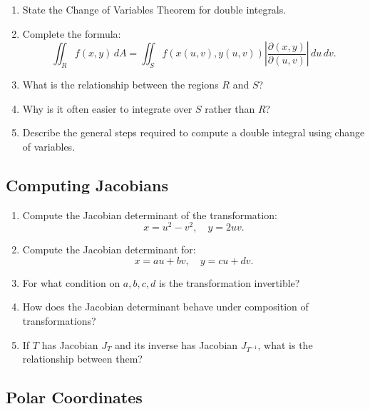 \begin{enumerate}

\item State the Change of Variables Theorem for double integrals.

\item Complete the formula:
  \[
    \iint_R f(x,y)\, dA
    =
    \iint_S f(x(u,v), y(u,v))
    \left| \frac{\partial(x,y)}{\partial(u,v)} \right|
    \, du\, dv.
  \]

\item What is the relationship between the regions $R$ and $S$?

\item Why is it often easier to integrate over $S$ rather than $R$?

\item Describe the general steps required to compute a double integral using change of variables.

\end{enumerate}

\subsection{Computing Jacobians}

\begin{enumerate}

\item Compute the Jacobian determinant of the transformation:
  \[
    x = u^2 - v^2, \quad y = 2uv.
  \]

\item Compute the Jacobian determinant for:
  \[
    x = au + bv, \quad y = cu + dv.
  \]

\item For what condition on $a,b,c,d$ is the transformation invertible?

\item How does the Jacobian determinant behave under composition of transformations?

\item If $T$ has Jacobian $J_T$ and its inverse has Jacobian $J_{T^{-1}}$, what is the relationship between them?

\end{enumerate}

\subsection{Polar Coordinates}

